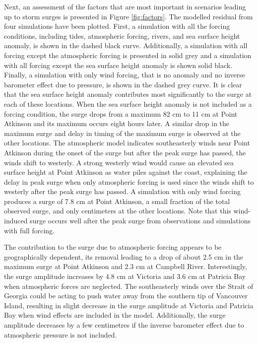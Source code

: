 \documentclass[pdftex,10pt]{article}
\begin{document}
Next, an assessment of the factors that are most important in scenarios leading up to storm surges is presented in Figure \ref{fig:factors}. The modelled residual from four simulations have been plotted. First, a simulation with all the forcing conditions, including tides, atmospheric forcing, rivers, and sea surface height anomaly, is shown in the dashed black curve. Additionally, a simulation with all forcing except the atmospheric forcing is presented in solid grey and a simulation with all forcing except the sea surface height anomaly is shown solid black. Finally, a simulation with only wind forcing, that is no anomaly and no inverse barometer effect due to pressure, is shown in the dashed grey curve. It is clear that the sea surface height anomaly contributes most significantly to the surge at each of these locations. When the sea surface height anomaly is not included as a forcing condition, the surge drops from a maximum 82 cm to 11 cm at Point Atkinson and its maximum occurs eight hours later.  A similar drop in the maximum surge and delay in timing of the maximum surge is observed at the other locations. The atmospheric model indicates southeasterly winds near Point Atkinson during the onset of the surge but after the peak surge has passed, the winds shift to westerly. A strong westerly wind would cause an elevated sea surface height at Point Atkinson as water piles against the coast, explaining the delay in peak surge when only atmospheric forcing is used since the winds shift to westerly after the peak surge has passed. A simulation with only wind forcing produces a surge of 7.8 cm at Point Atkinson, a small fraction of the total observed surge, and only centimeters at the other locations. Note that this wind-induced surge occurs well after the peak surge from observations and simulations with full forcing.

The contribution to the surge due to atmospheric forcing appears to be geographically dependent, its removal leading to a drop of about 2.5 cm in the maximum surge at Point Atkinson and 2.3 cm at Campbell River. Interestingly, the surge amplitude increases by 4.8 cm at Victoria and 3.6 cm at Patricia Bay when atmospheric forces are neglected. The southeasterly winds over the Strait of Georgia could be acting to push water away from the southern tip of Vancouver Island, resulting in slight decrease in the surge amplitude at Victoria and Patricia Bay when wind effects are included in the model. Additionally, the surge amplitude decreases by a few centimetres if the inverse barometer effect due to atmospheric pressure is not included. 
\end{document}
